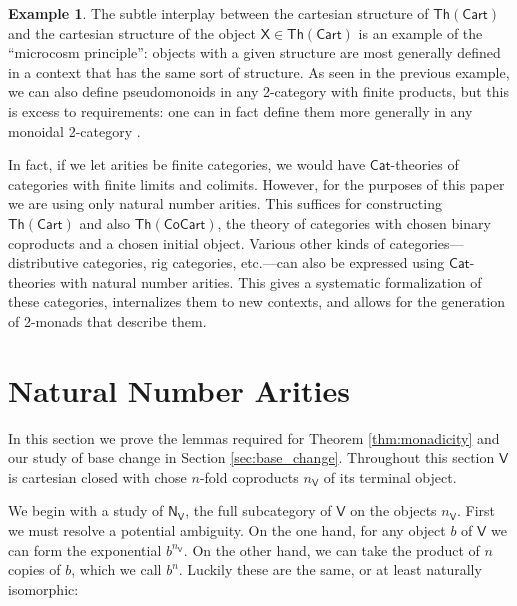 \documentclass{amsart}
\theoremstyle{definition}
\newtheorem{example}[theorem]{Example}
\newcommand{\Th}{\mathsf{Th}}
\newcommand{\Cat}{\mathsf{Cat}}
\newcommand{\NN}{\mathsf{N}}
\newcommand{\V}{\mathsf{V}}
\newcommand{\X}{\mathsf{X}}
\begin{document}
\begin{example}
The subtle interplay between the cartesian structure of $\Th(\mathsf{Cart})$ and the cartesian structure of the object $\X \in \Th(\mathsf{Cart})$ is an example of the ``microcosm principle'': objects with a given structure are most generally defined in a context that has the same sort of structure.   As seen in the previous example, we can also define pseudomonoids in any 2-category with finite products, but this is excess to requirements: one can in 
fact define them more generally in any monoidal 2-category \cite{pseudo}.

In fact, if we let arities be finite categories, we would have $\Cat$-theories of categories with finite limits and colimits.   However, for the purposes of this paper we are using only natural number arities.  This suffices for constructing $\Th(\mathsf{Cart})$ and also $\Th(\mathsf{CoCart})$, the theory of categories with chosen binary coproducts and a chosen initial object.   Various other kinds of categories---distributive categories, rig categories, etc.---can also be expressed using $\Cat$-theories with natural number arities. This gives a systematic formalization of these categories, internalizes them to new contexts, and allows for the generation of 2-monads that describe them.
\end{example}

\section{Natural Number Arities}
\label{sec:arities}

In this section we prove the lemmas required for Theorem \ref{thm:monadicity} and
our study of base change in Section \ref{sec:base_change}.  Throughout this section $\V$ is cartesian closed with chose $n$-fold coproducts $n_\V$ of its terminal object. 

We begin with a study of $\NN_\V$, the full subcategory of $\V$ on the objects $n_\V$.
First we must resolve a potential ambiguity.  On the one hand,
for any object $b$ of $\V$ we can form the exponential $b^{n_\V}$.   On the 
other hand, we can take the product of $n$ copies of $b$, which we call $b^n$.    
Luckily these are the same, or at least naturally isomorphic:
\end{document}
